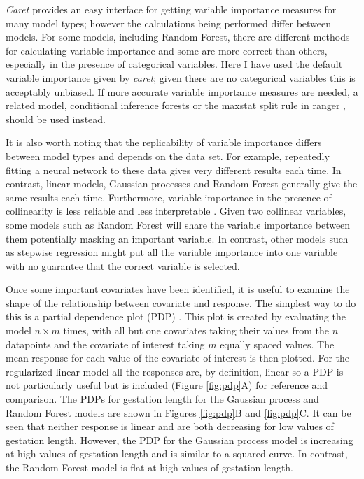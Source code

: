 \documentclass[12pt]{article}
\begin{document}
\emph{Caret} provides an easy interface for getting variable importance measures for many model types; however the calculations being performed differ between models.
For some models, including Random Forest, there are different methods for calculating variable importance \citep{oppel2009alternative, seifert2019surrogate, basu2018iterative, wright2016little} and some are more correct than others, especially in the presence of categorical variables.
Here I have used the default variable importance given by \emph{caret}; given there are no categorical variables this is acceptably unbiased.
If more accurate variable importance measures are needed, a related model, conditional inference forests \citep{hothorn2006unbiased} or the maxstat split rule in ranger \citep{wright2017unbiased}, should be used instead.


It is also worth noting that the replicability of variable importance differs between model types and depends on the data set.
For example, repeatedly fitting a neural network to these data gives very different results each time.
In contrast, linear models, Gaussian processes and Random Forest generally give the same results each time.
Furthermore, variable importance in the presence of collinearity is less reliable and less interpretable \citep{dormann2013collinearity}.
Given two collinear variables, some models such as Random Forest will share the variable importance between them potentially masking an important variable.
In contrast, other models such as stepwise regression might put all the variable importance into one variable with no guarantee that the correct variable is selected.

Once some important covariates have been identified, it is useful to examine the shape of the relationship between covariate and response.
The simplest way to do this is a partial dependence plot (PDP) \citep{friedman2001greedy}.
This plot is created by evaluating the model $n \times m$ times, with all but one covariates taking their values from the $n$ datapoints  and the covariate of interest taking $m$ equally spaced values. 
The mean response for each value of the covariate of interest is then plotted.
For the regularized linear model all the responses are, by definition, linear so a PDP is not particularly useful but is included (Figure \ref{fig:pdp}A) for reference and comparison.
The PDPs for gestation length for the Gaussian process and Random Forest models are shown in Figures \ref{fig:pdp}B and \ref{fig:pdp}C.
It can be seen that neither response is linear and are both decreasing for low values of gestation length.
However, the PDP for the Gaussian process model is increasing at high values of gestation length and is similar to a squared curve.
In contrast, the Random Forest model is flat at high values of gestation length.
\end{document}

